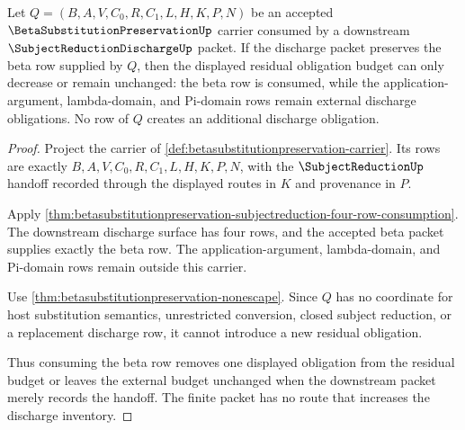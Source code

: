 \begin{theorem}
\label{thm:betasubstitutionpreservation-residual-budget-monotonicity}
Let $Q=(B,A,V,C_0,R,C_1,L,H,K,P,N)$ be an accepted $\BetaSubstitutionPreservationUp$ carrier consumed by a downstream $\SubjectReductionDischargeUp$ packet. If the discharge packet preserves the beta row supplied by $Q$, then the displayed residual obligation budget can only decrease or remain unchanged: the beta row is consumed, while the application-argument, lambda-domain, and Pi-domain rows remain external discharge obligations. No row of $Q$ creates an additional discharge obligation.
\end{theorem}
\begin{proof}
Project the carrier of \autoref{def:betasubstitutionpreservation-carrier}. Its rows are exactly $B,A,V,C_0,R,C_1,L,H,K,P,N$, with the $\SubjectReductionUp$ handoff recorded through the displayed routes in $K$ and provenance in $P$.

Apply \autoref{thm:betasubstitutionpreservation-subjectreduction-four-row-consumption}. The downstream discharge surface has four rows, and the accepted beta packet supplies exactly the beta row. The application-argument, lambda-domain, and Pi-domain rows remain outside this carrier.

Use \autoref{thm:betasubstitutionpreservation-nonescape}. Since $Q$ has no coordinate for host substitution semantics, unrestricted conversion, closed subject reduction, or a replacement discharge row, it cannot introduce a new residual obligation.

Thus consuming the beta row removes one displayed obligation from the residual budget or leaves the external budget unchanged when the downstream packet merely records the handoff. The finite packet has no route that increases the discharge inventory.
\end{proof}

